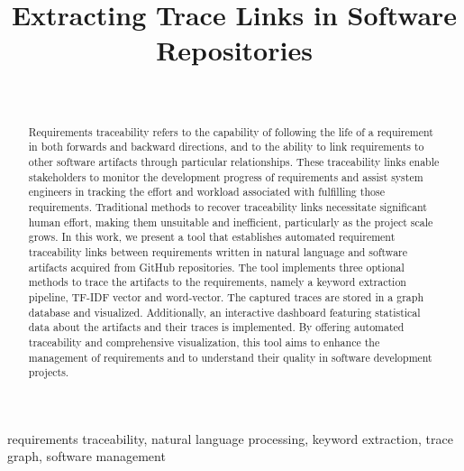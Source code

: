 \documentclass[conference]{IEEEtran}
\begin{document}
\title{Extracting Trace Links in Software Repositories}

\author{
  \\
}


\maketitle
\begin{abstract}
 Requirements traceability refers to the capability of following the life of a requirement in both forwards and backward directions, and to the ability to link requirements to other software artifacts through particular relationships.
These traceability links enable stakeholders to monitor the development progress of requirements and assist system engineers in tracking the effort and workload associated with fulfilling those requirements.
Traditional methods to recover traceability links necessitate significant human effort, making them unsuitable and inefficient, particularly as the project scale grows.
In this work, we present a tool that establishes automated requirement traceability links between requirements written in natural language and software artifacts acquired from GitHub repositories. The tool implements three optional methods to trace the artifacts to the requirements, namely a keyword extraction pipeline, TF-IDF vector and word-vector. The captured traces are stored in a graph database and visualized. Additionally, an interactive dashboard featuring statistical data about the artifacts and their traces is implemented. By offering automated traceability and comprehensive visualization, this tool aims to enhance the management of requirements and to understand their quality in software development projects.

\end{abstract}
\begin{IEEEkeywords}
requirements traceability, natural language processing,  keyword extraction, trace graph, software management
\end{IEEEkeywords}



















\end{document}
